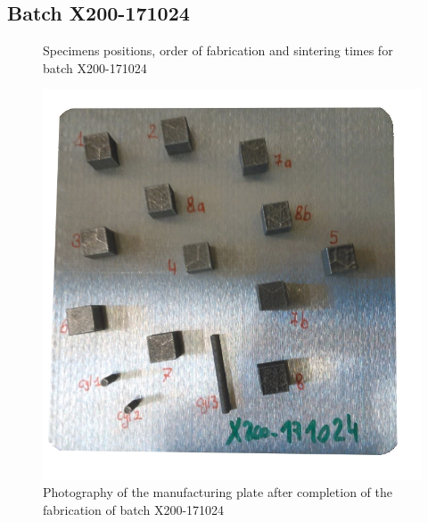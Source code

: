 \subsection{Batch X200-171024}

\begin{figure}[ht]
\centering
\noindent{}
\decoRule
\caption[Specimens positions, order of fabrication and sintering times for batch X200-171024]{Specimens positions, order of fabrication and sintering times for batch X200-171024}
\label{fig:171024-cad}
\end{figure}

\begin{figure}[ht]
\centering
\includegraphics[scale=0.45]{Images/171024-real}
\decoRule
\caption[Photography of the manufacturing plate after completion of the fabrication of batch X200-171024]{Photography of the manufacturing plate after completion of the fabrication of batch X200-171024}
\label{fig:171024-real}
\end{figure}


